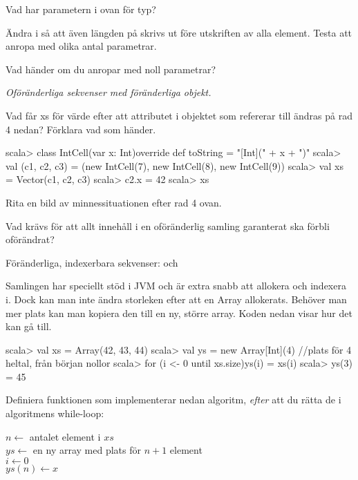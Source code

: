 \Subtask Vad har parametern  i  ovan för typ?

\Subtask Ändra i  så att även längden på  skrivs ut före utskriften av alla element. Testa att anropa  med olika antal parametrar. 

\Subtask Vad händer om du anropar  med noll parametrar?

\Task \emph{Oföränderliga sekvenser med föränderliga objekt.} 

\Subtask Vad får xs för värde efter att attributet i objektet som  refererar till ändras på rad 4 nedan? Förklara vad som händer.
\begin{REPL}
scala> class IntCell(var x: Int){override def toString = "[Int](" + x + ")"}
scala> val (c1, c2, c3) = (new IntCell(7), new IntCell(8), new IntCell(9))
scala> val xs = Vector(c1, c2, c3)
scala> c2.x = 42
scala> xs
\end{REPL}

\Subtask\Pen Rita en bild av minnessituationen efter rad 4 ovan.

\Subtask\Pen Vad krävs för att allt innehåll i en oföränderlig samling garanterat ska förbli oförändrat? 

\Task Föränderliga, indexerbara sekvenser:  och 

\Subtask Samlingen  har speciellt stöd i JVM och är extra snabb att allokera och indexera i. Dock kan man inte ändra storleken efter att en Array allokerats. Behöver man mer plats kan man kopiera den till en ny, större array. Koden nedan visar hur det kan gå till.
\begin{REPL}
scala> val xs = Array(42, 43, 44)
scala> val ys = new Array[Int](4)  //plats för 4 heltal, från början nollor
scala> for (i <- 0 until xs.size){ys(i) = xs(i)}
scala> ys(3) = 45
\end{REPL}
Definiera funktionen  som implementerar nedan algoritm, \emph{efter} att du rätta de \textbf{\color{red}{två buggarna}} i algoritmens while-loop:

\begin{algorithm}[H]
 
 $n \leftarrow$ antalet element i $xs$ \\
 $ys \leftarrow$ en ny array med plats för $n + 1$ element\\
 $i \leftarrow 0$  \\
 $ys(n) \leftarrow x$ 
\end{algorithm}



